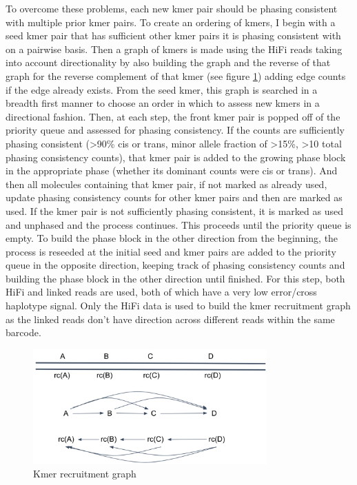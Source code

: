 \par{
To overcome these problems, each new kmer pair should be phasing consistent with multiple prior kmer pairs. To create an ordering of kmers, I begin with a seed kmer pair that has sufficient other kmer pairs it is phasing consistent with on a pairwise basis. Then a graph of kmers is made using the HiFi reads taking into account directionality by also building the graph and the reverse of that graph for the reverse complement of that kmer (see figure \ref{figure:assemblygraph}) adding edge counts if the edge already exists. From the seed kmer, this graph is searched in a breadth first manner to choose an order in which to assess new kmers in a directional fashion. Then, at each step, the front kmer pair is popped off of the priority queue and assessed for phasing consistency. If the counts are sufficiently phasing consistent (>90\% cis or trans, minor allele fraction of >15\%, >10 total phasing consistency counts), that kmer pair is added to the growing phase block in the appropriate phase (whether its dominant counts were cis or trans). And then all molecules containing that kmer pair, if not marked as already used, update phasing consistency counts for other kmer pairs and then are marked as used. If the kmer pair is not sufficiently phasing consistent, it is marked as used and unphased and the process continues. This proceeds until the priority queue is empty. To build the phase block in the other direction from the beginning, the process is reseeded at the initial seed and kmer pairs are added to the priority queue in the opposite direction, keeping track of phasing consistency counts and building the phase block in the other direction until finished. For this step, both HiFi and linked reads are used, both of which have a very low error/cross haplotype signal. Only the HiFi data is used to build the kmer recruitment graph as the linked reads don't have direction across different reads within the same barcode.
}

\begin{figure}[htbp!]
\caption{Kmer recruitment graph}
\label{figure:assemblygraph}
\begin{centering}
\includegraphics[width=0.8\textwidth]{assemblygraph.png}
\end{centering}

\end{figure}

